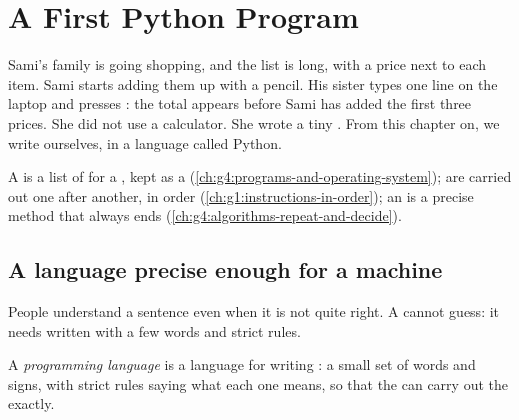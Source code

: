 \chapter{A First Python Program}\label{ch:g6:first-python-program}

Sami's family is going shopping, and the list is long, with a price next
to each item. Sami starts adding them up with a pencil. His sister types one line on
the laptop and presses : the total appears before Sami has added the
first three prices. She did not use a calculator. She wrote a tiny . From
this chapter on, we write  ourselves, in a language called Python.

\begin{recall}
A  is a list of  for a , kept as a 
(\cref{ch:g4:programs-and-operating-system});  are carried out one
after another, in order (\cref{ch:g1:instructions-in-order}); an  is a
precise method that always ends (\cref{ch:g4:algorithms-repeat-and-decide}).
\end{recall}

\section{A language precise enough for a machine}

People understand a sentence even when it is not quite right. A 
cannot guess: it needs  written with a few words and strict rules.

\begin{definition}\label{def:g6:first-python-program:language}
A \emph{programming language} is a language for
writing : a small set of words and signs, with strict rules saying
what each one means, so that the  can carry out the  exactly.
\end{definition}


